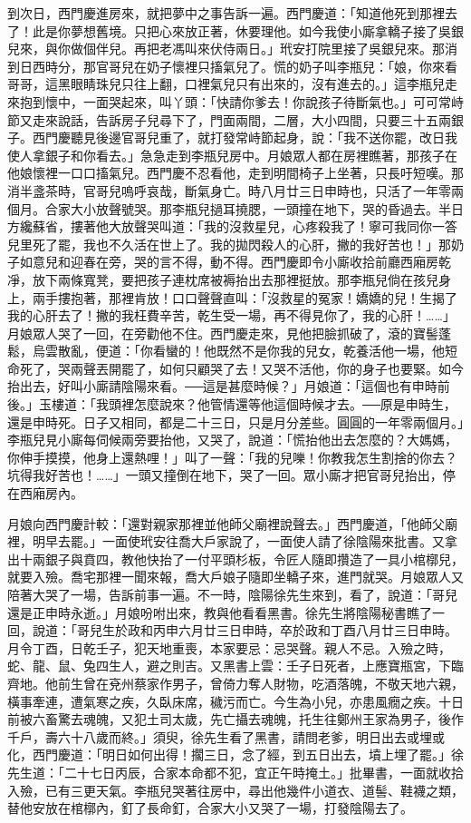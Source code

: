 到次日，西門慶進房來，就把夢中之事告訴一遍。西門慶道：「知道他死到那裡去了！此是你夢想舊境。只把心來放正著，休要理他。如今我使小廝拿轎子接了吳銀兒來，與你做個伴兒。再把老馮叫來伏侍兩日。」玳安打院里接了吳銀兒來。那消到日西時分，那官哥兒在奶子懷裡只搐氣兒了。慌的奶子叫李瓶兒：「娘，你來看哥哥，這黑眼睛珠兒只往上翻，口裡氣兒只有出來的，沒有進去的。」這李瓶兒走來抱到懷中，一面哭起來，叫丫頭：「快請你爹去！你說孩子待斷氣也。」可可常峙節又走來說話，告訴房子兒尋下了，門面兩間，二層，大小四間，只要三十五兩銀子。西門慶聽見後邊官哥兒重了，就打發常峙節起身，說：「我不送你罷，改日我使人拿銀子和你看去。」急急走到李瓶兒房中。月娘眾人都在房裡瞧著，那孩子在他娘懷裡一口口搐氣兒。西門慶不忍看他，走到明間椅子上坐著，只長吁短嘆。那消半盞茶時，官哥兒嗚呼哀哉，斷氣身亡。時八月廿三日申時也，只活了一年零兩個月。合家大小放聲號哭。那李瓶兒撾耳撓腮，一頭撞在地下，哭的昏過去。半日方纔蘇省，摟著他大放聲哭叫道：「我的沒救星兒，心疼殺我了！寧可我同你一答兒里死了罷，我也不久活在世上了。我的拋閃殺人的心肝，撇的我好苦也！」那奶子如意兒和迎春在旁，哭的言不得，動不得。西門慶即令小廝收拾前廳西廂房乾凈，放下兩條寬凳，要把孩子連枕席被褥抬出去那裡挺放。那李瓶兒倘在孩兒身上，兩手摟抱著，那裡肯放！口口聲聲直叫：「沒救星的冤家！嬌嬌的兒！生揭了我的心肝去了！撇的我枉費辛苦，乾生受一場，再不得見你了，我的心肝！……」 月娘眾人哭了一回，在旁勸他不住。西門慶走來，見他把臉抓破了，滾的寶髻蓬鬆，烏雲散亂，便道：「你看蠻的！他既然不是你我的兒女，乾養活他一場，他短命死了，哭兩聲丟開罷了，如何只顧哭了去！又哭不活他，你的身子也要緊。如今抬出去，好叫小廝請陰陽來看。──這是甚麼時候？」月娘道：「這個也有申時前後。」玉樓道：「我頭裡怎麼說來？他管情還等他這個時候才去。──原是申時生，還是申時死。日子又相同，都是二十三日，只是月分差些。圓圓的一年零兩個月。」李瓶兒見小廝每伺候兩旁要抬他，又哭了，說道：「慌抬他出去怎麼的？大媽媽，你伸手摸摸，他身上還熱哩！」叫了一聲：「我的兒嚛！你教我怎生割捨的你去？坑得我好苦也！……」一頭又撞倒在地下，哭了一回。眾小廝才把官哥兒抬出，停在西廂房內。

月娘向西門慶計較：「還對親家那裡並他師父廟裡說聲去。」西門慶道，「他師父廟裡，明早去罷。」一面使玳安往喬大戶家說了，一面使人請了徐陰陽來批書。又拿出十兩銀子與賁四，教他快抬了一付平頭杉板，令匠人隨即攢造了一具小棺槨兒，就要入殮。喬宅那裡一聞來報，喬大戶娘子隨即坐轎子來，進門就哭。月娘眾人又陪著大哭了一場，告訴前事一遍。不一時，陰陽徐先生來到，看了，說道：「哥兒還是正申時永逝。」月娘吩咐出來，教與他看看黑書。徐先生將陰陽秘書瞧了一回，說道：「哥兒生於政和丙申六月廿三日申時，卒於政和丁酉八月廿三日申時。月令丁酉，日乾壬子，犯天地重喪，本家要忌：忌哭聲。親人不忌。入殮之時，蛇、龍、鼠、兔四生人，避之則吉。又黑書上雲：壬子日死者，上應寶瓶宮，下臨齊地。他前生曾在兗州蔡家作男子，曾倚力奪人財物，吃酒落魄，不敬天地六親，橫事牽連，遭氣寒之疾，久臥床席，穢污而亡。今生為小兒，亦患風癇之疾。十日前被六畜驚去魂魄，又犯土司太歲，先亡攝去魂魄，托生往鄭州王家為男子，後作千戶，壽六十八歲而終。」須臾，徐先生看了黑書，請問老爹，明日出去或埋或化，西門慶道：「明日如何出得！擱三日，念了經，到五日出去，墳上埋了罷。」徐先生道：「二十七日丙辰，合家本命都不犯，宜正午時掩土。」批畢書，一面就收拾入殮，已有三更天氣。李瓶兒哭著往房中，尋出他幾件小道衣、道髻、鞋襪之類，替他安放在棺槨內，釘了長命釘，合家大小又哭了一場，打發陰陽去了。

